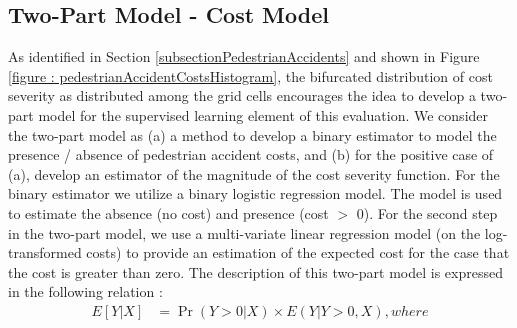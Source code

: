 \documentclass{llncs}
\begin{document}
\subsection{Two-Part Model - Cost Model}

As identified in Section \ref{subsectionPedestrianAccidents} and shown in Figure \ref{figure : pedestrianAccidentCostsHistogram}, the bifurcated distribution of cost severity as distributed among the grid cells encourages the idea to develop a two-part model for the supervised learning element of this evaluation. We consider the two-part model as (a) a method to develop a binary estimator to model the presence / absence of pedestrian accident costs, and (b) for the positive case of (a), develop an estimator of the magnitude of the cost severity function.
For the binary estimator we utilize a binary logistic regression model. The model is used to estimate the absence (no cost) and presence (cost $>$ 0). For the second step in the two-part model, we use a multi-variate linear regression model (on the log-transformed costs) to provide an estimation of the expected cost for the case that the cost is greater than zero. The description of this two-part model is expressed in the following relation : 
% 
\begin{align}
E[Y| X] &= \Pr(Y > 0 | X)\times E(Y | Y > 0,  X), where
\end{align}
\end{document}
